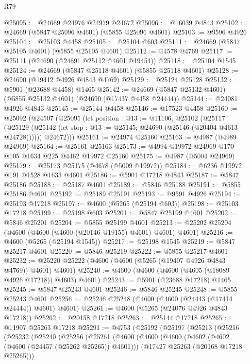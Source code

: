 \begin{lexlean}{R79}
\begin{coremodule}
@25095 := @24669 @24976 @24979 @24672
@25096 := @16039 @4843
@25102 := @24669 (@5847 @25096 @4601) (@5855 @25096 @4601)
@25103 := @9596 @4926
@25104 := @25103 @4458
@25105 := @25104 @603
@25111 := @24669 (@5847 @25105 @4601) (@5855 @25105 @4601)
@25112 := @4578 @4769
@25117 := @25111 (@24690 (@24691 @25112 @4601 @19454))
@25118 := @25104 @1545
@25124 := @24669 (@5847 @25118 @4601) (@5855 @25118 @4601)
@25128 := @24690 (@19412 @4926 @4843 @4769)
@25129 := @25124 @25128
@25132 := @5901 (@23688 @4458) @1465
@25142 := @24669 (@5847 @25132 @4601) (@5855 @25132 @4601) (@24690 (@17437 @4458 @24444))
@25144 := @24081 @4926 @4843
@25145 := @25144 @4458
@25146 := @17523 @4458
@25160 := @25092
    (@24507
      (@25095
        (let position : @13 := @11106;
        @25102
          (@25117
            (@25129 (@25142 (let stop : @13 := @25145; @24690 (@25146 (@20404 @4613 @24728))))))
          @24672)))
@25161 := @24974 @25160
@25163 := @4987 (@4989 @24969)
@25164 := @25161 @25163
@25173 := @4994 @19972 @24969 @170 @105 @1634 @225 @4462 @19972 @25160
@25175 := @4987 (@5004 @24969)
@25179 := @25173 @25175 (@4678 (@5009 @19972))
@25184 := @6236 @19972 @191 @1528 @1633 @4601
@25186 := @5901 @17218 @4843
@25187 := @5847 @25186
@25188 := @25187 @4601
@25189 := @5846 @25188
@25191 := @5855 @25186 @4601
@25192 := @25189 @25191
@25193 := @9591 @4926
@25194 := @25193 @17218
@25197 := @4600 (@5265 (@25194 @603))
@25198 := @25103 @17218
@25199 := @25198 @603
@25201 := @5847 @25199 @4601
@25202 := @5846 @25201
@25204 := @5855 @25199 @4601
@25213 := @25202 @25204 (@4600 (@4600 (@4600 (@20146 @19155) @4601) @4601) @4601)
@25216 := @4600 (@5265 (@25194 @1545))
@25217 := @25198 @1545
@25219 := @5847 @25217 @4601
@25220 := @5846 @25219
@25222 := @5855 @25217 @4601
@25232 := @25220 @25222 (@4600 (@4600 (@5265 (@19407 @4926 @4843 @4769)) @4601) @4601)
@25240 := @4600 (@4600 (@4600 (@4605 (@18089 @4926 @17218)) @4603) @4601)
@25243 := @5901 (@23688 @17218) @1465
@25245 := @5847 @25243 @4601
@25246 := @5846 @25245
@25248 := @5855 @25243 @4601
@25256 := @25246 @25248 (@4600 (@4600 (@24443 (@17414 @24444)) @4601) @4601)
@25261 := @4600 (@5265 (@24076 @4926 @4843 @17218))
@25262 := @20158 @17218
@25263 := @25144 @17218
@25265 := @11907 @25263 @17218
@25291 := @4753
    (@25192
      (@25197
        (@25213
          (@25216
            (@25232
              (@25240
                (@25256
                  (@25261
                    (@4600
                      (@4600
                        (@4600
                          (@4602 (@4602 (@4600 (@24457 (@25262 @25265)) @4601)))
                          (@17427 @25263 (@20168 @17218 @25265)))

\end{coremodule}
\end{lexlean}
